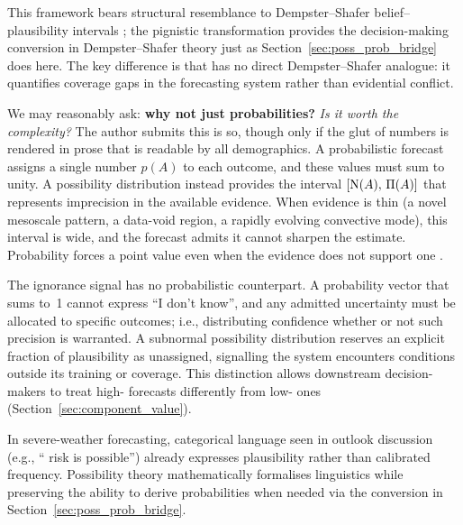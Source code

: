 This framework bears structural resemblance to Dempster--Shafer
belief--plausibility
intervals \citep{Yager2005-at};
the pignistic transformation
\citep{Smets1990-nf} provides the decision-making conversion in
Dempster--Shafer theory just as
Section~\ref{sec:poss_prob_bridge} does here. The key difference is
that \ign{} has no direct Dempster--Shafer analogue: it quantifies
coverage gaps in the forecasting system
rather than evidential conflict.

We may reasonably ask: \textbf{why not just probabilities?} \textit{Is it worth the complexity?} The author submits this is so, though only if the glut of numbers is rendered in prose that is readable by all demographics. A probabilistic forecast assigns a single
number $p(A)$ to each outcome,
and these values must sum to unity.
A possibility distribution instead
provides the interval $[\mathrm{N}(A),\, \Pi(A)]$
that represents imprecision in the available
evidence. When evidence is thin (a
novel mesoscale pattern, a data-void region, a rapidly evolving
convective mode), this interval is wide, and the forecast admits it
cannot sharpen the estimate.
Probability forces a point value even when
the evidence does not support
one \citep{Dubois2007-dd}.

The ignorance signal \ign{} has no probabilistic counterpart. A
probability vector that sums to~1 cannot
express ``I don't know'', and any
admitted uncertainty must be allocated to
specific outcomes;
i.e., distributing confidence whether or not
such precision is warranted. A subnormal
possibility distribution reserves an explicit fraction of plausibility
as unassigned, signalling the system encounters conditions outside
its training or coverage.
This distinction allows downstream
decision-makers to
treat high-\ign{} forecasts differently
from low-\ign{} ones
(Section~\ref{sec:component_value}).

In severe-weather forecasting,
categorical language seen in outlook discussion
(e.g., `` risk is possible'')
already expresses plausibility rather than
calibrated frequency.
Possibility theory mathematically formalises
linguistics while preserving the ability to
derive probabilities when needed via the
conversion in Section~\ref{sec:poss_prob_bridge}.

